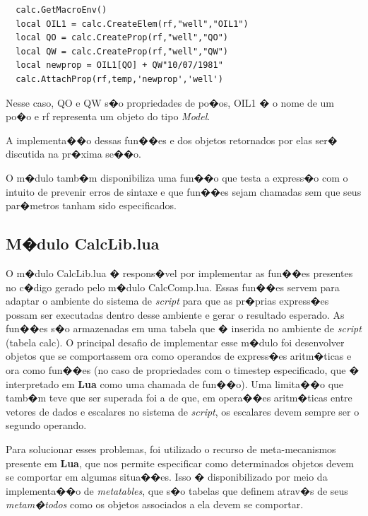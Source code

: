 \documentclass[dissertacao,modelo1,brazil]{ThesisPUC}
\newcommand{\script}{\emph{script}}
\begin{document}
\begin{verbatim}
  calc.GetMacroEnv()
  local OIL1 = calc.CreateElem(rf,"well","OIL1")
  local QO = calc.CreateProp(rf,"well","QO")
  local QW = calc.CreateProp(rf,"well","QW")
  local newprop = OIL1[QO] + QW"10/07/1981"
  calc.AttachProp(rf,temp,'newprop','well')
\end{verbatim}

Nesse caso, QO e QW s�o propriedades de po�os, OIL1 � o nome de um po�o e rf representa
um objeto do tipo \emph{Model}.

A implementa��o dessas fun��es e dos objetos retornados por elas ser� discutida
na pr�xima se��o.

O m�dulo tamb�m disponibiliza uma fun��o que testa a express�o com o intuito de 
prevenir erros de sintaxe e que fun��es sejam chamadas sem que seus par�metros tanham
sido especificados.


\subsection{M�dulo CalcLib.lua}

O m�dulo CalcLib.lua � respons�vel por implementar as fun��es presentes
no c�digo gerado pelo m�dulo CalcComp.lua. Essas fun��es servem para
adaptar o ambiente do sistema de \script{} para que as pr�prias express�es
possam ser executadas dentro desse ambiente e gerar o resultado esperado.
As fun��es s�o armazenadas em uma tabela que � inserida no ambiente de
\script{} (tabela calc). O principal desafio de implementar esse m�dulo
foi desenvolver objetos que se comportassem ora como operandos de 
express�es aritm�ticas e ora como fun��es (no caso de propriedades
com o timestep especificado, que � interpretado em  \textbf{Lua} como uma chamada
de fun��o). Uma limita��o que tamb�m teve que ser superada foi a de que,
em opera��es aritm�ticas entre vetores de dados e escalares no sistema de \script{},
os escalares devem sempre ser o segundo operando.

Para solucionar esses problemas, foi utilizado o recurso de meta-mecanismos
presente em \textbf{Lua}, que nos permite especificar como determinados objetos devem se
comportar em algumas situa��es. Isso � disponibilizado por meio da implementa��o 
de \emph{metatables}, que s�o tabelas que definem atrav�s de seus \emph{metam�todos}
como os objetos associados a ela devem se comportar.
\end{document}
